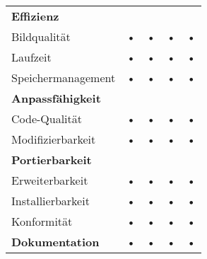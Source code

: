 \begin{center}
\begin{tabular}{lcccc}
\hline 
\rule[-1ex]{0pt}{4ex} \textbf{Effizienz} &  &  &  &  \\ 
\rule[-1ex]{0pt}{4ex} \hspace{10pt} Bildqualität & • & • & • & • \\ 
\rule[-1ex]{0pt}{4ex} \hspace{10pt} Laufzeit & • & • & • & • \\ 
\rule[-1ex]{0pt}{4ex} \hspace{10pt} Speichermanagement & • & • & • & • \\ 

\hline 
\rule[-1ex]{0pt}{4ex} \textbf{Anpassfähigkeit} &  &  &  &  \\ 
\rule[-1ex]{0pt}{4ex} \hspace{10pt} Code-Qualität & • & • & • & • \\ 
\rule[-1ex]{0pt}{4ex} \hspace{10pt} Modifizierbarkeit & • & • & • & • \\ 

\hline 
\rule[-1ex]{0pt}{4ex} \textbf{Portierbarkeit} &  &  &  &  \\ 
\rule[-1ex]{0pt}{4ex} \hspace{10pt} Erweiterbarkeit & • & • & • & • \\ 
\rule[-1ex]{0pt}{4ex} \hspace{10pt} Installierbarkeit & • & • & • & • \\ 
\rule[-1ex]{0pt}{4ex} \hspace{10pt} Konformität & • & • & • & • \\ 

\hline 
\rule[-1ex]{0pt}{4ex} \textbf{Dokumentation} & • & • & • & • \\ 
\hline 
\end{tabular} 
\end{center}
